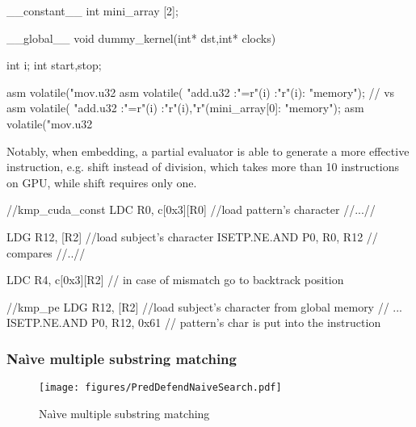    \begin{listing}
    \begin{pyglist}[language=C, caption=Memory benchmark,label=code:mem_bench]
__constant__ int mini_array [2];

__global__ void dummy_kernel(int* dst,int* clocks){

    int i;
    int start,stop;

    asm volatile("mov.u32 %
    asm volatile(
                "add.u32 %
                :"=r"(i) :"r"(i): "memory");
    // vs
    asm volatile(
                "add.u32 %
                :"=r"(i) :"r"(i),"r"(mini_array[0]: "memory");
    asm volatile("mov.u32 %
    }
    \end{pyglist}
    \end{listing}

   Notably, when embedding, a partial evaluator is able to generate a more effective instruction, e.g.
   shift instead of division, which takes more than 10 instructions on GPU,
   while shift requires only one.

\begin{listing}
\begin{pyglist}[language=C,caption=KMP partial evaluation,label=code:kmp_spec]
    //kmp_cuda_const
LDC R0, c[0x3][R0] //load pattern's character
    //...//

LDG R12, [R2] //load subject's character
ISETP.NE.AND P0, R0, R12 // compares
    //..//

LDC R4, c[0x3][R2] // in case of mismatch go to backtrack position

    //kmp_pe
LDG R12, [R2] //load subject's character from global memory
    //    ...
ISETP.NE.AND P0, R12, 0x61 // pattern's char is put into the instruction
\end{pyglist}
\end{listing}

\subsubsection{Na\`ive multiple substring matching}\label{nmsm}

\begin{figure}
    \centering
    \texttt{[image: figures/PredDefendNaiveSearch.pdf]}
    \caption{Na\`ive multiple substring matching}
    \label{fig:naive_multy}
\end{figure}

